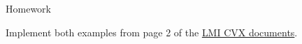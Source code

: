 \documentclass{beamer}
\begin{document}
%
%
%
%



\begin{frame}{Homework}
\begin{flushleft}


Implement both examples from page 2 of the \href{http://stanford.edu/class/ee363/notes/lmi-cvx.pdf}{LMI CVX documents}.

\end{flushleft}
\end{frame}






\myqrframe
\end{document}
